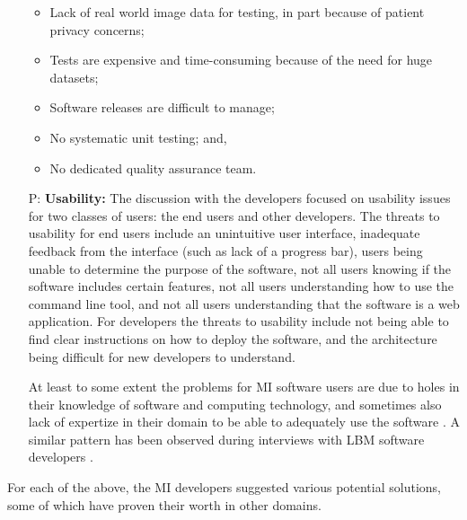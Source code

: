 \documentclass[draft, 12pt, 3p, times]{elsarticle} %
\newcounter{pnum} %
\begin{document}
\begin{enumerate}
\begin{itemize}
\item Lack of real world image data for testing, in part because of patient
privacy concerns;
\item Tests are expensive and time-consuming because of the need for huge
datasets;
\item Software releases are difficult to manage;
\item No systematic unit testing; and,
\item No dedicated quality assurance team.
\end{itemize}

\item[P\refstepcounter{pnum}\thepnum \label{P_Usability}:] \textbf{Usability:}
The discussion with the developers focused on usability issues for two classes
of users: the end users and other developers.  The threats to usability for end
users include an unintuitive user interface, inadequate feedback from the
interface (such as lack of a progress bar), users being unable to determine the
purpose of the software, not all users knowing if the software includes certain
features, not all users understanding how to use the command line tool, and not
all users understanding that the software is a web application. For developers
the threats to usability include not being able to find clear instructions on
how to deploy the software, and the architecture being difficult for new
developers to understand.

At least to some extent the problems for MI software users are due to holes in
their knowledge of software and computing technology, and sometimes also lack of
expertize in their domain to be able to adequately use the software
\cite{WieseEtAl2019}.  A similar pattern has been observed during interviews
with LBM software developers \cite{SmithEtAl2024}.

\end{enumerate}

For each of the above, the MI developers suggested various potential
solutions, some of which have proven their worth in other domains.
\end{document}
